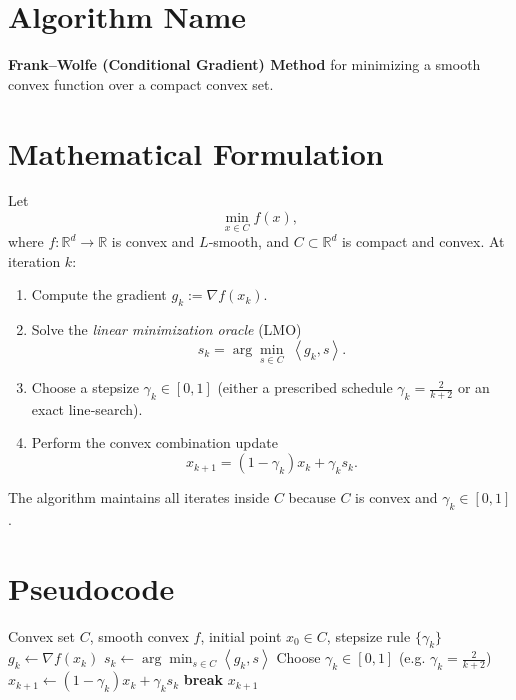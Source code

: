 \documentclass{article}
\newcommand{\ip}[2]{\left\langle #1,#2\right\rangle}
\begin{document}
\section*{Algorithm Name}
\textbf{Frank–Wolfe (Conditional Gradient) Method} for minimizing a smooth convex function over a compact convex set.

\section*{Mathematical Formulation}
Let 
\[
\min_{x\in C} f(x),
\]
where $f:\mathbb{R}^d\to\mathbb{R}$ is convex and $L$‑smooth, and $C\subset\mathbb{R}^d$ is compact and convex.  
At iteration $k$:

\begin{enumerate}[label=\arabic*.]
    \item Compute the gradient $g_k:=\nabla f(x_k)$.
    \item Solve the \emph{linear minimization oracle} (LMO) 
    \[
    s_k = \arg\min_{s\in C}\;\ip{g_k}{s}.
    \tag{LMO}
    \]
    \item Choose a stepsize $\gamma_k\in[0,1]$ (either a prescribed schedule $\gamma_k=\frac{2}{k+2}$ or an exact line‑search).  
    \item Perform the convex combination update 
    \[
    x_{k+1}= (1-\gamma_k)x_k + \gamma_k s_k .
    \tag{FW‑Update}
    \]
\end{enumerate}

The algorithm maintains all iterates inside $C$ because $C$ is convex and $\gamma_k\in[0,1]$.

\section*{Pseudocode}
\begin{algorithm}[H]
\caption{Frank–Wolfe}
\begin{algorithmic}[1]
\Require Convex set $C$, smooth convex $f$, initial point $x_0\in C$, stepsize rule $\{\gamma_k\}$ 
    \State $g_k \gets \nabla f(x_k)$
    \State $s_k \gets \displaystyle\arg\min_{s\in C}\ip{g_k}{s}$ 
    \State Choose $\gamma_k\in[0,1]$ (e.g. $\gamma_k=\frac{2}{k+2}$)
    \State $x_{k+1}\gets (1-\gamma_k)x_k+\gamma_k s_k$
        \State \textbf{break}
    \EndIf
\EndFor
\State \Return $x_{k+1}$
\end{algorithmic}
\end{algorithm}
\end{document}
